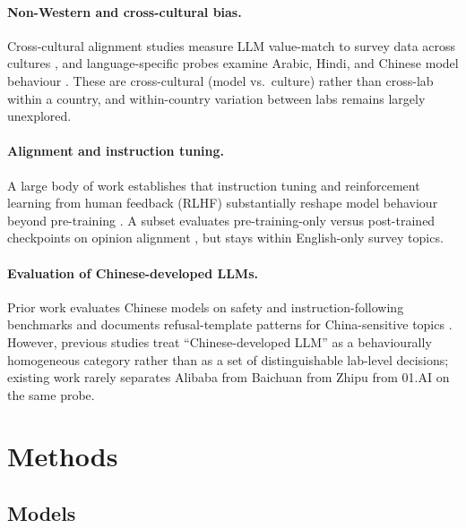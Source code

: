 \documentclass[letterpaper]{article} %
\begin{document}
\paragraph{Non-Western and cross-cultural bias.} Cross-cultural alignment studies measure LLM value-match to survey data across cultures \citep{tao2024cultural,durmus2024globalopinionqa}, and language-specific probes examine Arabic, Hindi, and Chinese model behaviour \citep{naous2024beer,cao2023assessing}. These are cross-cultural (model vs.\ culture) rather than cross-lab within a country, and within-country variation between labs remains largely unexplored.

\paragraph{Alignment and instruction tuning.} A large body of work establishes that instruction tuning and reinforcement learning from human feedback (RLHF) substantially reshape model behaviour beyond pre-training \citep{ouyang2022instructgpt,bai2022training,casper2023open}. A subset evaluates pre-training-only versus post-trained checkpoints on opinion alignment \citep{durmus2024globalopinionqa}, but stays within English-only survey topics.

\paragraph{Evaluation of Chinese-developed LLMs.} Prior work evaluates Chinese models on safety and instruction-following benchmarks \citep{zhang2024safetybench,xu2023align} and documents refusal-template patterns for China-sensitive topics \citep{wang2024decodingtrust,deshpande2023toxicity}. However, previous studies treat ``Chinese-developed LLM'' as a behaviourally homogeneous category rather than as a set of distinguishable lab-level decisions; existing work rarely separates Alibaba from Baichuan from Zhipu from 01.AI on the same probe.

\section{Methods}

\subsection{Models}
\end{document}
